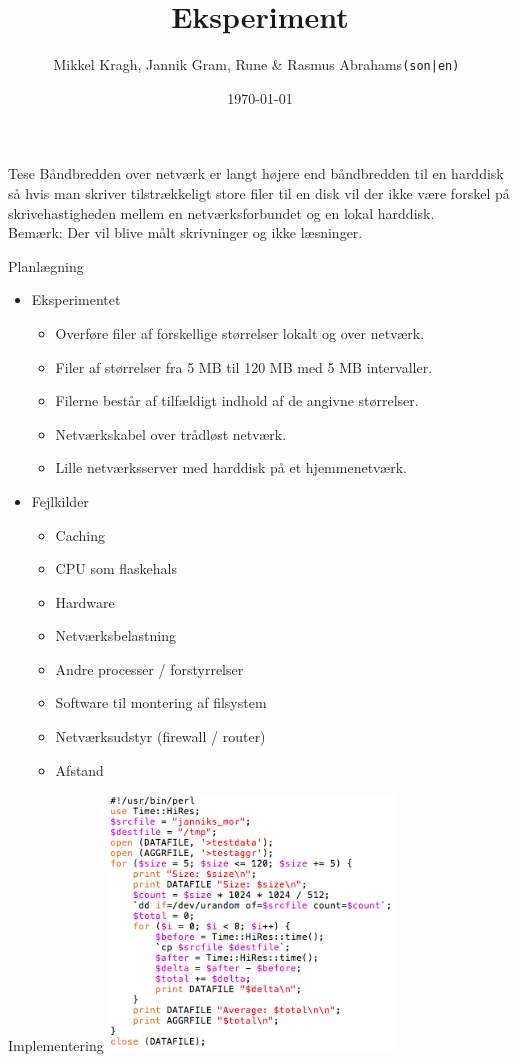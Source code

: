 \documentclass{beamer}
\title[Eksperiment]{Eksperiment}
\author{Mikkel Kragh, Jannik Gram, Rune \& Rasmus Abrahams{\tt (son|en) }}
\institute{DIKU}
\date{\today}
\begin{document}
\begin{frame}
\titlepage
\end{frame}


\begin{frame}{Tese}
Båndbredden over netværk er langt højere end båndbredden til en harddisk så hvis man skriver tilstrækkeligt store filer til en disk vil der ikke være forskel på skrivehastigheden mellem en netværksforbundet og en lokal harddisk.\\
$$ $$
Bemærk: Der vil blive målt skrivninger og ikke læsninger.
\end{frame}


\begin{frame}{Planlægning}
\begin{itemize}
\item Eksperimentet
\begin{itemize}
\item Overføre filer af forskellige størrelser lokalt og over netværk.
\item Filer af størrelser fra 5 MB til 120 MB med 5 MB intervaller.
\item Filerne består af tilfældigt indhold af de angivne størrelser.
\item Netværkskabel over trådløst netværk.
\item Lille netværksserver med harddisk på et hjemmenetværk.
\end{itemize}
\item Fejlkilder
\begin{itemize}
\item Caching
\item CPU som flaskehals
\item Hardware
\item Netværksbelastning
\item Andre processer / forstyrrelser
\item Software til montering af filsystem
\item Netværksudstyr (firewall / router)
\item Afstand
\end{itemize}
\end{itemize}
\end{frame}


\begin{frame}{Implementering}
\includegraphics[width=3in]{kode.png}
\end{frame}
\end{document}
